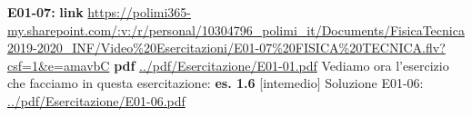\textbf{E01-07:}\newline 
\textbf{link} \url{https://polimi365-my.sharepoint.com/:v:/r/personal/10304796_polimi_it/Documents/FisicaTecnica2019-2020_INF/Video%20Esercitazioni/E01-07%20FISICA%20TECNICA.flv?csf=1&e=amavbC}\newline
\textbf{pdf} \url{../pdf/Esercitazione/E01-01.pdf}\newline
\newline
\newline
Vediamo ora l'esercizio che facciamo in questa esercitazione:\newline
\newline
\textbf{es. 1.6} [intemedio]\newline
Soluzione E01-06: \url{../pdf/Esercitazione/E01-06.pdf}